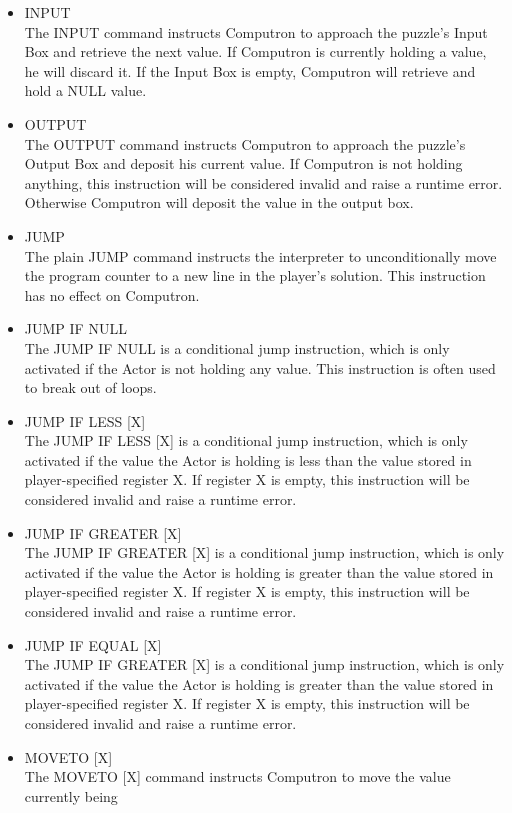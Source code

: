 \begin{itemize}
 	\item INPUT\\
	The INPUT command instructs Computron to approach the puzzle's Input Box and 
	retrieve the next value. If Computron is currently holding a value, he will discard it. 
	If the Input Box is empty, Computron will retrieve and hold a NULL value.
	\item OUTPUT\\
	The OUTPUT command instructs Computron to approach the puzzle's Output Box 
	and deposit his current value. If Computron is not holding anything, this instruction 
	will be considered invalid and raise a runtime error. Otherwise Computron will deposit 
	the value in the output box.
	\item JUMP\\
	The plain JUMP command instructs the interpreter to unconditionally move the program 
	counter to a new line in the player's solution. This instruction has no effect on Computron.
	\item JUMP IF NULL\\
	The JUMP IF NULL is a conditional jump instruction, which is only activated if the Actor
	 is not holding any value. This instruction is often used to break out of loops.
	\item JUMP IF LESS [X]\\
	The JUMP IF LESS [X] is a conditional jump instruction, which is only activated if the 
	value the Actor is holding is less than the value stored in player-specified register X. If 
	register X is empty, this instruction will be considered invalid and raise a runtime error.
	\item JUMP IF GREATER [X]\\
	The JUMP IF GREATER [X] is a conditional jump instruction, which is only activated if 
	the value the Actor is holding is greater than the value stored in player-specified register 
	X. If register X is empty, this instruction will be considered invalid and raise a runtime error.
	\item JUMP IF EQUAL [X]\\
	The JUMP IF GREATER [X] is a conditional jump instruction, which is only activated if 
	the value the Actor is holding is greater than the value stored in player-specified register 
	X. If register X is empty, this instruction will be considered invalid and raise a runtime error.
	\item MOVETO [X]\\
	The MOVETO [X] command instructs Computron to move the value currently being 

\end{itemize}

